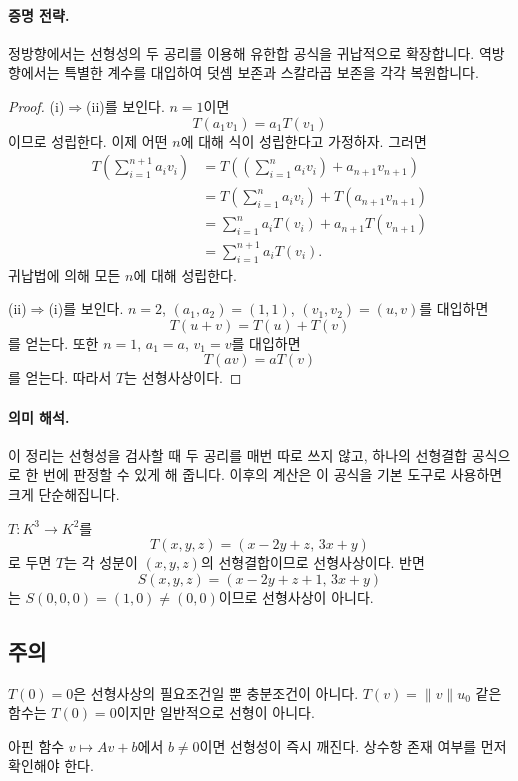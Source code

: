 \paragraph{증명 전략.}
정방향에서는 선형성의 두 공리를 이용해 유한합 공식을 귀납적으로 확장합니다. 역방향에서는 특별한 계수를 대입하여 덧셈 보존과 스칼라곱 보존을 각각 복원합니다.

\begin{proof}
(i)$\Rightarrow$(ii)를 보인다. $n=1$이면
\[
T(a_1v_1)=a_1T(v_1)
\]
이므로 성립한다. 이제 어떤 $n$에 대해 식이 성립한다고 가정하자. 그러면
\[
\begin{aligned}
T\!\left(\sum_{i=1}^{n+1}a_iv_i\right)
&=T\!\left(\left(\sum_{i=1}^{n}a_iv_i\right)+a_{n+1}v_{n+1}\right)\\
&=T\!\left(\sum_{i=1}^{n}a_iv_i\right)+T(a_{n+1}v_{n+1})\\
&=\sum_{i=1}^{n}a_iT(v_i)+a_{n+1}T(v_{n+1})\\
&=\sum_{i=1}^{n+1}a_iT(v_i).
\end{aligned}
\]
귀납법에 의해 모든 $n$에 대해 성립한다.

(ii)$\Rightarrow$(i)를 보인다. $n=2$, $(a_1,a_2)=(1,1)$, $(v_1,v_2)=(u,v)$를 대입하면
\[
T(u+v)=T(u)+T(v)
\]
를 얻는다. 또한 $n=1$, $a_1=a$, $v_1=v$를 대입하면
\[
T(av)=aT(v)
\]
를 얻는다. 따라서 $T$는 선형사상이다.
\end{proof}

\paragraph{의미 해석.}
이 정리는 선형성을 검사할 때 두 공리를 매번 따로 쓰지 않고, 하나의 선형결합 공식으로 한 번에 판정할 수 있게 해 줍니다. 이후의 계산은 이 공식을 기본 도구로 사용하면 크게 단순해집니다.

\begin{example}
$T:K^3\to K^2$를
\[
T(x,y,z)=(x-2y+z,\,3x+y)
\]
로 두면 $T$는 각 성분이 $(x,y,z)$의 선형결합이므로 선형사상이다. 반면
\[
S(x,y,z)=(x-2y+z+1,\,3x+y)
\]
는 $S(0,0,0)=(1,0)\ne(0,0)$이므로 선형사상이 아니다.
\end{example}

\subsection*{주의}
\begin{warning}
$T(0)=0$은 선형사상의 필요조건일 뿐 충분조건이 아니다. $T(v)=\|v\|u_0$ 같은 함수는 $T(0)=0$이지만 일반적으로 선형이 아니다.
\end{warning}
\begin{warning}
아핀 함수 $v\mapsto Av+b$에서 $b\ne 0$이면 선형성이 즉시 깨진다. 상수항 존재 여부를 먼저 확인해야 한다.
\end{warning}

